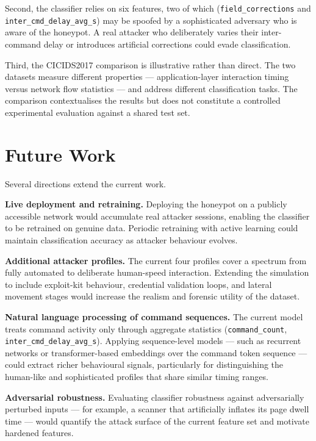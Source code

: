 Second, the classifier relies on six features, two of which
(\texttt{field\_corrections} and \texttt{inter\_cmd\_delay\_avg\_s})
may be spoofed by a sophisticated adversary who is aware of the
honeypot. A real attacker who deliberately varies their inter-command
delay or introduces artificial corrections could evade classification.

Third, the CICIDS2017 comparison is illustrative rather than direct.
The two datasets measure different properties — application-layer
interaction timing versus network flow statistics — and address
different classification tasks. The comparison contextualises the
results but does not constitute a controlled experimental evaluation
against a shared test set.

\section{Future Work}

Several directions extend the current work.

\textbf{Live deployment and retraining.} Deploying the honeypot on a
publicly accessible network would accumulate real attacker sessions,
enabling the classifier to be retrained on genuine data. Periodic
retraining with active learning could maintain classification accuracy
as attacker behaviour evolves.

\textbf{Additional attacker profiles.} The current four profiles cover
a spectrum from fully automated to deliberate human-speed interaction.
Extending the simulation to include exploit-kit behaviour, credential
validation loops, and lateral movement stages would increase the
realism and forensic utility of the dataset.

\textbf{Natural language processing of command sequences.} The current
model treats command activity only through aggregate statistics
(\texttt{command\_count}, \texttt{inter\_cmd\_delay\_avg\_s}). Applying
sequence-level models — such as recurrent networks or transformer-based
embeddings over the command token sequence — could extract richer
behavioural signals, particularly for distinguishing the human-like and
sophisticated profiles that share similar timing ranges.

\textbf{Adversarial robustness.} Evaluating classifier robustness
against adversarially perturbed inputs — for example, a scanner that
artificially inflates its page dwell time — would quantify the attack
surface of the current feature set and motivate hardened features.

